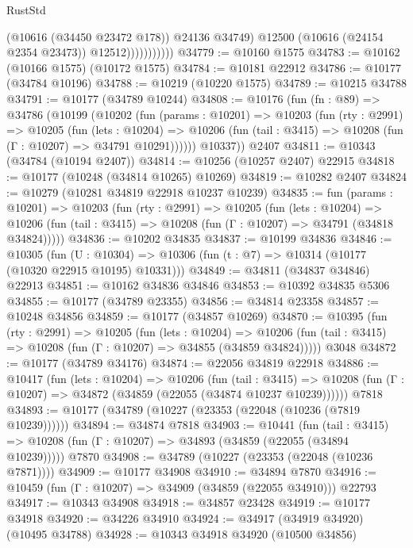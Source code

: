 \begin{lexlean}{RustStd}
\begin{coremodule}
                            (@10616 (@34450 @23472 @178))
                            @24136
                            @34749)
                          @12500
                          (@10616 (@24154 @2354 @23473))
                          @12512)))))))))))
@34779 := @10160 @1575
@34783 := @10162 (@10166 @1575) (@10172 @1575)
@34784 := @10181 @22912
@34786 := @10177 (@34784 @10196)
@34788 := @10219 (@10220 @1575)
@34789 := @10215 @34788
@34791 := @10177 (@34789 @10244)
@34808 := @10176
    (fun (fn : @89) =>
    @34786
      (@10199
        (@10202
          (fun (params : @10201) =>
          @10203
            (fun (rty : @2991) =>
            @10205
              (fun (lets : @10204) =>
              @10206 (fun (tail : @3415) => @10208 (fun (Γ : @10207) => @34791 @10291))))))
        @10337))
    @2407
@34811 := @10343 (@34784 (@10194 @2407))
@34814 := @10256 (@10257 @2407) @22915
@34818 := @10177 (@10248 (@34814 @10265) @10269)
@34819 := @10282 @2407
@34824 := @10279 (@10281 @34819 @22918 @10237 @10239)
@34835 := fun (params : @10201) =>
  @10203
    (fun (rty : @2991) =>
    @10205
      (fun (lets : @10204) =>
      @10206 (fun (tail : @3415) => @10208 (fun (Γ : @10207) => @34791 (@34818 @34824)))))
@34836 := @10202 @34835
@34837 := @10199 @34836
@34846 := @10305
    (fun (U : @10304) => @10306 (fun (t : @7) => @10314 (@10177 (@10320 @22915 @10195) @10331)))
@34849 := @34811 (@34837 @34846) @22913
@34851 := @10162 @34836 @34846
@34853 := @10392 @34835 @5306
@34855 := @10177 (@34789 @23355)
@34856 := @34814 @23358
@34857 := @10248 @34856
@34859 := @10177 (@34857 @10269)
@34870 := @10395
    (fun (rty : @2991) =>
    @10205
      (fun (lets : @10204) =>
      @10206 (fun (tail : @3415) => @10208 (fun (Γ : @10207) => @34855 (@34859 @34824)))))
    @3048
@34872 := @10177 (@34789 @34176)
@34874 := @22056 @34819 @22918
@34886 := @10417
    (fun (lets : @10204) =>
    @10206
      (fun (tail : @3415) =>
      @10208 (fun (Γ : @10207) => @34872 (@34859 (@22055 (@34874 @10237 @10239))))))
    @7818
@34893 := @10177 (@34789 (@10227 (@23353 (@22048 (@10236 (@7819 @10239))))))
@34894 := @34874 @7818
@34903 := @10441
    (fun (tail : @3415) => @10208 (fun (Γ : @10207) => @34893 (@34859 (@22055 (@34894 @10239)))))
    @7870
@34908 := @34789 (@10227 (@23353 (@22048 (@10236 @7871))))
@34909 := @10177 @34908
@34910 := @34894 @7870
@34916 := @10459 (fun (Γ : @10207) => @34909 (@34859 (@22055 @34910))) @22793
@34917 := @10343 @34908
@34918 := @34857 @23428
@34919 := @10177 @34918
@34920 := @34226 @34910
@34924 := @34917 (@34919 @34920) (@10495 @34788)
@34928 := @10343 @34918 @34920 (@10500 @34856)

\end{coremodule}
\end{lexlean}
